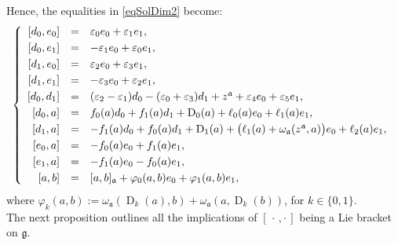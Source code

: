 \documentclass[final,1p,times,nopreprintline]{elsarticle}
\theoremstyle{definition}
\numberwithin{equation}{section}
\newcommand{\w}{\omega}
\newcommand{\g}{\mathfrak{g}}
\newcommand{\ai}{\mathfrak{a}}
\numberwithin{equation}{section}
\newcommand{\D}{\operatorname{D}}
\begin{document}
Hence, the equalities in \eqref{eqSolDim2} become:
\begin{equation}\label{eqSolDim2II}
	\left\{
	\begin{array}{r c l}\vspace{1mm}
		\left[d_0,e_0\right]&=&\varepsilon_0e_0+\varepsilon_1e_1,\\\vspace{1mm}
		\left[d_0,e_1\right]&=&-\varepsilon_1e_0+\varepsilon_0e_1,\\\vspace{1mm}
		\left[d_1,e_0\right]&=&\varepsilon_2e_0+\varepsilon_3e_1,\\\vspace{1mm}
		\left[d_1,e_1\right]&=&-\varepsilon_3e_0+\varepsilon_2e_1,\\\vspace{1mm}
		\left[d_0,d_1\right]&=&(\varepsilon_2-\varepsilon_1)d_0-(\varepsilon_0+\varepsilon_3)d_1+z^\ai+\varepsilon_4e_0+\varepsilon_5e_1,\\\vspace{1mm}
		\left[d_0,a\right]&=&f_0(a)d_0+f_1(a)d_1+\D_0(a)+\ell_0(a)e_0+\ell_1(a)e_1,\\\vspace{1mm} 
		\left[d_1,a\right]&=&-f_1(a)d_0+f_0(a)d_1+\D_1(a)+\big(\ell_1(a)+\w_\ai(z^\ai,a)\big)e_0+\ell_2(a)e_1,\\\vspace{1mm}
		\left[e_0,a\right]&=&-f_0(a)e_0+f_1(a)e_1,\hfill\\\vspace{1mm}
		\left[e_1,a\right]&=&-f_1(a)e_0-f_0(a)e_1,\\
		\left[a,b\right]&=&[a,b]_\ai+\varphi_0(a,b)e_0+\varphi_1(a,b)e_1,
	\end{array}
	\right.\\
\end{equation}
where $\varphi_k(a,b):=\w_\ai(\D_k(a),b)+\w_\ai(a,\D_k(b))$, for $k\in\{0,1\}$.\\

The next proposition outlines all the implications of $[\,\cdot\,,\cdot\,]$ being a Lie bracket on $\g$.
\end{document}
